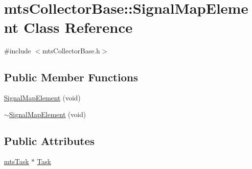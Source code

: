 \hypertarget{classmts_collector_base_1_1_signal_map_element}{\section{mts\-Collector\-Base\-:\-:Signal\-Map\-Element Class Reference}
\label{classmts_collector_base_1_1_signal_map_element}
}


{\ttfamily \#include $<$mts\-Collector\-Base.\-h$>$}

\subsection*{Public Member Functions}
\begin{DoxyCompactItemize}
\item 
\hyperlink{classmts_collector_base_1_1_signal_map_element_a498356d3c9dd40e508c9b8caeccaf796}{Signal\-Map\-Element} (void)
\item 
\hyperlink{classmts_collector_base_1_1_signal_map_element_ad473fba6072141f2adedbf4aa4a5f098}{$\sim$\-Signal\-Map\-Element} (void)
\end{DoxyCompactItemize}
\subsection*{Public Attributes}
\begin{DoxyCompactItemize}
\item 
\hyperlink{classmts_task}{mts\-Task} $\ast$ \hyperlink{classmts_collector_base_1_1_signal_map_element_ad0f11dad0c8c30479e8b811795719ae4}{Task}
\end{DoxyCompactItemize}


